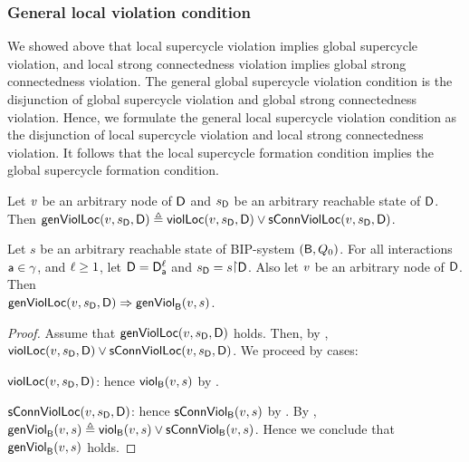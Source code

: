 \subsubsection{General local violation condition}

We showed above that local supercycle violation implies global supercycle violation, and local
strong connectedness violation implies global strong connectedness violation.  The general global
supercycle violation condition is the disjunction of global supercycle violation and global strong
connectedness violation.  Hence, we formulate the general local supercycle violation condition as the
disjunction of local supercycle violation and local strong connectedness violation.  It follows that
the local supercycle formation condition implies the global supercycle formation condition.


\begin{definition}
\label{def:locFormation.violation}
\label{defn:locFormation.violation}
Let $\mathit{v}$ be an arbitrary node of $\mathsf{D}$ and $s_\mathsf{D}$ be an arbitrary reachable state of $\mathsf{D}$.
Then $\mathsf{genViolLoc}(v,s_\mathsf{D},\mathsf{D})  \triangleq \mathsf{violLoc}(v,s_\mathsf{D},\mathsf{D}) \lor \mathsf{sConnViolLoc}(v,s_\mathsf{D},\mathsf{D})$.
\end{definition}


\begin{proposition} \label{prop:locFromViol-implies-formViol}
\label{prop:locformviol-implies-formviol}
Let $s$ be an arbitrary reachable state of BIP-system $(\mathsf{B}, Q_0)$.
For all interactions $\mathsf{a} \in \gamma$, and $\ell \ge 1$, let $\mathsf{D} = \mathsf{D}_{\mathsf{a}}^{\ell}$ and $\sD = s \pj \dsk{\act}{\l}$.
Also let $\mathit{v}$ be an arbitrary node of $\mathsf{D}$.
Then\\
\ind $ \mathsf{genViolLoc}(v,s_\mathsf{D},\mathsf{D}) \Rightarrow \mathsf{genViol}_{\mathsf{B}}(v,s)$.
\end{proposition}
%
\begin{proof}
Assume that $\mathsf{genViolLoc}(v,s_\mathsf{D},\mathsf{D})$ holds. Then, by ,
$\mathsf{violLoc}(v,s_\mathsf{D},\mathsf{D}) \lor \mathsf{sConnViolLoc}(v,s_\mathsf{D},\mathsf{D})$.
We proceed by cases:
\bn
\item $\mathsf{violLoc}(v,s_\mathsf{D},\mathsf{D})$: hence $\mathsf{viol}_{\mathsf{B}}(v,s)$ by .
\item $\mathsf{sConnViolLoc}(v,s_\mathsf{D},\mathsf{D})$: hence $\mathsf{sConnViol}_{\mathsf{B}}(v,s)$ by .
\en
By ,  $\mathsf{genViol}_{\mathsf{B}}(v,s)  \triangleq \mathsf{viol}_{\mathsf{B}}(v,s)  \lor \mathsf{sConnViol}_{\mathsf{B}}(v,s)$.
Hence we conclude that $\mathsf{genViol}_{\mathsf{B}}(v,s)$ holds.
\end{proof}




